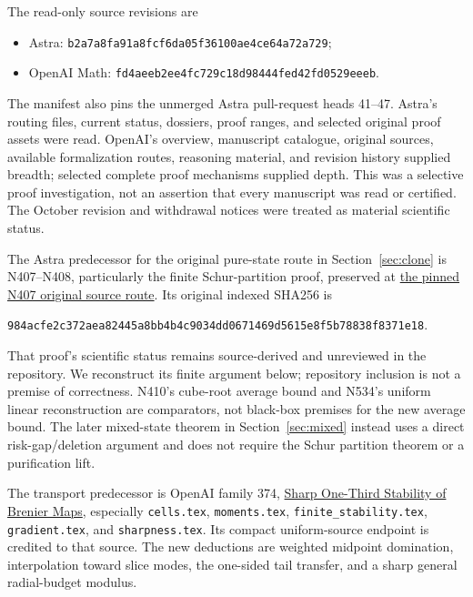 \documentclass[11pt]{article}
\begin{document}
The read-only source revisions are
\begin{itemize}
\item Astra: \texttt{b2a7a8fa91a8fcf6da05f36100ae4ce64a72a729};
\item OpenAI Math: \texttt{fd4aeeb2ee4fc729c18d98444fed42fd0529eeeb}.
\end{itemize}
The manifest also pins the unmerged Astra pull-request heads 41--47. Astra's routing files, current status, dossiers, proof ranges, and selected original proof assets were read. OpenAI's overview, manuscript catalogue, original sources, available formalization routes, reasoning material, and revision history supplied breadth; selected complete proof mechanisms supplied depth. This was a selective proof investigation, not an assertion that every manuscript was read or certified. The October revision and withdrawal notices were treated as material scientific status.

The Astra predecessor for the original pure-state route in Section~\ref{sec:clone} is N407--N408, particularly the finite Schur-partition proof, preserved at
\href{https://github.com/harjassand/astra-research-knowledge/blob/b2a7a8fa91a8fcf6da05f36100ae4ce64a72a729/web/pages/d-2115f1527533d2f7.html}{the pinned N407 original source route}.
Its original indexed SHA256 is
\begin{center}\small\texttt{984acfe2c372aea82445a8bb4b4c9034dd0671469d5615e8f5b78838f8371e18}.
\end{center}
That proof's scientific status remains source-derived and unreviewed in the repository. We reconstruct its finite argument below; repository inclusion is not a premise of correctness. N410's cube-root average bound and N534's uniform linear reconstruction are comparators, not black-box premises for the new average bound. The later mixed-state theorem in Section~\ref{sec:mixed} instead uses a direct risk-gap/deletion argument and does not require the Schur partition theorem or a purification lift.

The transport predecessor is OpenAI family 374,
\href{https://github.com/openai/math/tree/fd4aeeb2ee4fc729c18d98444fed42fd0529eeeb/preprints/Sharp-One-Third-Stability-of-Brenier-Maps-September-25-2026/build/source/sections}{Sharp One-Third Stability of Brenier Maps}, especially \texttt{cells.tex}, \texttt{moments.tex}, \texttt{finite\_stability.tex}, \texttt{gradient.tex}, and \texttt{sharpness.tex}. Its compact uniform-source endpoint is credited to that source. The new deductions are weighted midpoint domination, interpolation toward slice modes, the one-sided tail transfer, and a sharp general radial-budget modulus.
\end{document}
